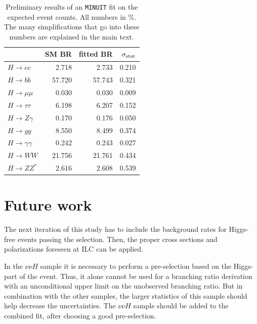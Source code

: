 \documentclass[11pt, hidelinks, a4paper]{scrartcl}
\newcommand{\tn}[1]{\textnormal{#1}}
\begin{document}
\begin{table}[ht]
    \centering
    \begin{tabular}{lrrr}
        \toprule
        {} &  SM BR &  fitted BR &  $\sigma_{\tn{stat}}$ \\
        \midrule
        $H\to cc$           &  2.718 &    2.733 &     0.210 \\
        $H\to bb$           & 57.720 &   57.743 &     0.321 \\
        $H\to \mu\mu$       &  0.030 &    0.030 &     0.009 \\
        $H\to \tau\tau$     &  6.198 &    6.207 &     0.152 \\
        $H\to Z\gamma$      &  0.170 &    0.176 &     0.050 \\
        $H\to gg$           &  8.550 &    8.499 &     0.374 \\
        $H\to \gamma\gamma$ &  0.242 &    0.243 &     0.027 \\
        $H\to WW$           & 21.756 &   21.761 &     0.434 \\
        $H\to ZZ^*$         &  2.616 &    2.608 &     0.539 \\
        \bottomrule
        \end{tabular}
    \caption{
        Preliminary results of an \texttt{MINUIT} fit on the expected event counts.
        All numbers in \%. \\
        The many simplifications that go into these numbers
        are explained in the main text.
        }\label{tab:br_uncertainties}
\end{table}

\section{Future work}\label{sec:future_work}
The next iteration of this study has to include the background rates for
Higgs-free events passing the selection.
Then, the proper cross sections and polarizations foreseen at ILC
can be applied.

In the $\nu \nu H$ sample it is necessary to perform a pre-selection based on
the Higgs-part of the event.
Thus, it alone cannot be used for a branching ratio derivation with
an unconditional upper limit on the unobserved branching ratio.
But in combination with the other samples, the larger statistics of this
sample should help decrease the uncertainties.
The $\nu \nu H$ sample should be added to the combined fit,
after choosing a good pre-selection.
\end{document}
